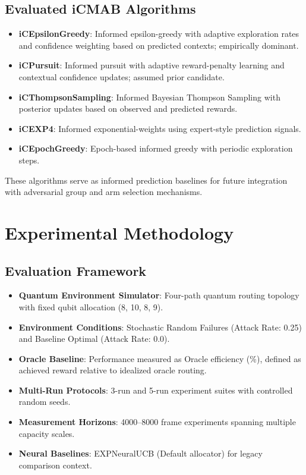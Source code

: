 \documentclass[12pt,a4paper]{article}
\begin{document}
\subsection{Evaluated iCMAB Algorithms}
\begin{itemize}
\item \textbf{iCEpsilonGreedy}: Informed epsilon-greedy with adaptive exploration rates and confidence weighting based on predicted contexts; empirically dominant.
\item \textbf{iCPursuit}: Informed pursuit with adaptive reward-penalty learning and contextual confidence updates; assumed prior candidate.
\item \textbf{iCThompsonSampling}: Informed Bayesian Thompson Sampling with posterior updates based on observed and predicted rewards.
\item \textbf{iCEXP4}: Informed exponential-weights using expert-style prediction signals.
\item \textbf{iCEpochGreedy}: Epoch-based informed greedy with periodic exploration steps.
\end{itemize}

These algorithms serve as informed prediction baselines for future integration with adversarial group and arm selection mechanisms.

\section{Experimental Methodology}

\subsection{Evaluation Framework}
\begin{itemize}
\item \textbf{Quantum Environment Simulator}: Four-path quantum routing topology with fixed qubit allocation (8, 10, 8, 9).
\item \textbf{Environment Conditions}: Stochastic Random Failures (Attack Rate: 0.25) and Baseline Optimal (Attack Rate: 0.0).
\item \textbf{Oracle Baseline}: Performance measured as Oracle efficiency (\%), defined as achieved reward relative to idealized oracle routing.
\item \textbf{Multi-Run Protocols}: 3-run and 5-run experiment suites with controlled random seeds.
\item \textbf{Measurement Horizons}: 4000--8000 frame experiments spanning multiple capacity scales.
\item \textbf{Neural Baselines}: EXPNeuralUCB (Default allocator) for legacy comparison context.
\end{itemize}
\end{document}
